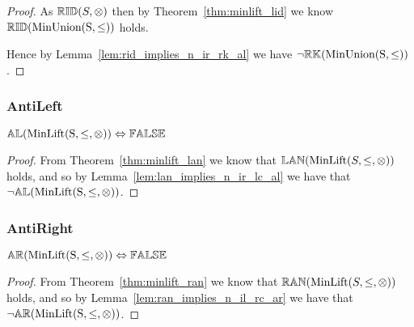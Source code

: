 \documentclass[../Summary.tex]{subfiles}
\begin{document}
\begin{proof}

\vspace{0.5em}
As ${\mathbb{RID}}(S, \otimes)$ then by Theorem~\ref{thm:minlift_lid} we know ${\mathbb{RID}}(\mathrm{MinUnion(S,\leq)})$ holds.

\vspace{0.5em}
Hence by Lemma~\ref{lem:rid_implies_n_ir_rk_al} we have $\neg {\mathbb{RK}}(\mathrm{MinUnion(S,\leq)})$.
\end{proof}




\subsubsection{AntiLeft}

\begin{theorem} \label{thm:minlift_al}
${\mathbb{AL}}(\mathrm{MinLift(S,\leq,\otimes)}) \Leftrightarrow {\mathbb{FALSE}}$
\end{theorem}

\begin{proof}

\vspace{0.5em}
From Theorem~\ref{thm:minlift_lan} we know that ${\mathbb{LAN}}(\mathrm{MinLift}(S,\leq,\otimes))$ holds, and so by Lemma~\ref{lem:lan_implies_n_ir_lc_al} we have that $\neg {\mathbb{AL}}(\mathrm{MinLift(S,\leq,\otimes)})$.
\end{proof}




\subsubsection{AntiRight}

\begin{theorem} \label{thm:minlift_ar}
${\mathbb{AR}}(\mathrm{MinLift(S,\leq,\otimes)}) \Leftrightarrow {\mathbb{FALSE}}$
\end{theorem}

\begin{proof}

\vspace{0.5em}
From Theorem~\ref{thm:minlift_ran} we know that ${\mathbb{RAN}}(\mathrm{MinLift}(S,\leq,\otimes))$ holds, and so by Lemma~\ref{lem:ran_implies_n_il_rc_ar} we have that $\neg {\mathbb{AR}}(\mathrm{MinLift(S,\leq,\otimes)})$.
\end{proof}
\end{document}
